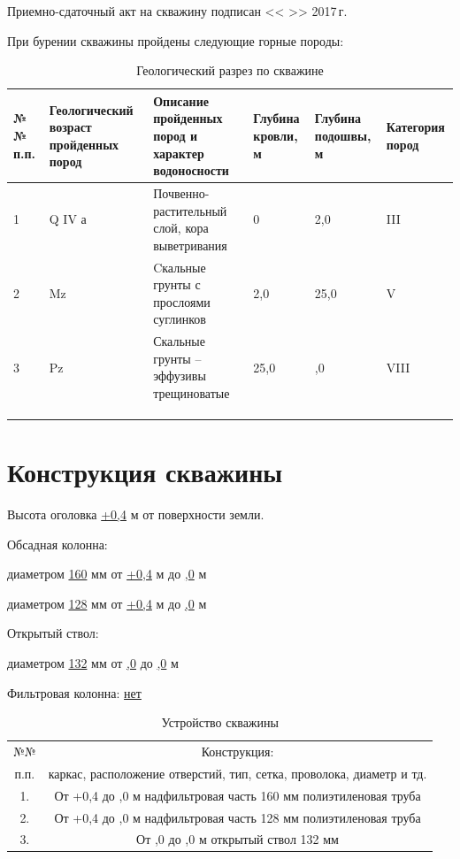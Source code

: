 \documentclass[a4paper,12pt]{article} %
\DeclareRobustCommand{\diameter}{%
	\text{\usefont{LS1}{stixscr}{m}{n}\symbol{"60}}%
}
\newcommand{\txtYear}{2017}						%
\newcommand{\txtOgolovok}{+0,4}					%
\newcommand{\txtDepth}{,0}					%
\newcommand{\txtCondMaterial}{полиэтиленовая}	%
\newcommand{\txtCondDiam}{160}					%
\newcommand{\txtCondBtm}{,0}					%
\newcommand{\txtTubeMaterial}{полиэтиленовая}	%
\newcommand{\txtTubeDiam}{128}					%
\newcommand{\txtTubeBtm}{,0}					%
\newcommand{\txtGeological}{
	1 & Q IV а & Почвенно-растительный слой, кора выветривания & 0    & 2,0       & III \\  \hline
	2 & Mz     & Cкальные грунты с прослоями суглинков         & 2,0  & 25,0      & V   \\  \hline
	3 & Pz     & Скальные грунты – эффузивы трещиноватые       & 25,0 & \txtDepth & VIII \\ \hline
	&  &  &  &  &  \\ 	\hline 
	&  &  &  &  &  \\ 	\hline 
	&  &  &  &  &  \\ 	\hline 
}
\begin{document}
	\bigskip
	
	Приемно-сдаточный акт на скважину подписан << \underline{\hspace{0.7cm}} >> \underline{\hspace{3cm}} \txtYear \,г.	
	
	\pagebreak
	
	При бурении скважины пройдены следующие горные породы:

	\begin{table}[!h]\footnotesize
	\centering
	\caption{Геологический разрез по скважине}
	\begin{tabular}{|p{0.7cm}|p{2cm}|p{7cm}|p{1.5cm}|p{1.5cm}|p{1cm}|}
		\hline 
		№№ п.п. & Геологи\-ческий возраст пройденных пород & Описание пройденных пород и характер водоносности & Глубина кровли, м & Глубина подошвы, м & Катего\-рия пород \\ 
		\hline 
	
		\txtGeological  %
	
\end{tabular} 
	\end{table}

	\section*{Конструкция скважины}

	Высота оголовка	\underline{\txtOgolovok} м	от поверхности земли. 
	
	\bigskip

	Обсадная колонна:

	диаметром \underline{\txtCondDiam} мм от \underline{\txtOgolovok} м до \underline{\txtCondBtm}  м  		
	
	диаметром \underline{\txtTubeDiam} мм от \underline{\txtOgolovok} м до \underline{\txtTubeBtm} м
	
	\bigskip

	Открытый ствол:

	 диаметром \underline{132} мм от \underline{\txtTubeBtm} до \underline{\txtDepth} м 
    
    \bigskip
	
	Фильтровая колонна: \underline{нет}
	
\begin{table}[!h]
\caption{Устройство скважины}
\centering
\begin{tabular}{|c|c|}
	\hline 
	№№ & Конструкция: \\ 
	п.п. & каркас, расположение отверстий, тип, сетка, проволока, диаметр и тд. \\ 
	\hline 
	1. & От {\txtOgolovok} до {\txtCondBtm} м   надфильтровая часть \diameter {\txtCondDiam} мм {\txtCondMaterial} труба \\ 
	\hline 
	2. & От {\txtOgolovok} до {\txtTubeBtm} м   надфильтровая часть \diameter {\txtTubeDiam} мм {\txtTubeMaterial} труба \\ 
	\hline 
	3. & От {\txtTubeBtm} до {\txtDepth} м   открытый ствол {\diameter} 132 мм \\ 
	\hline 
\end{tabular} 
\end{table}
\end{document}

